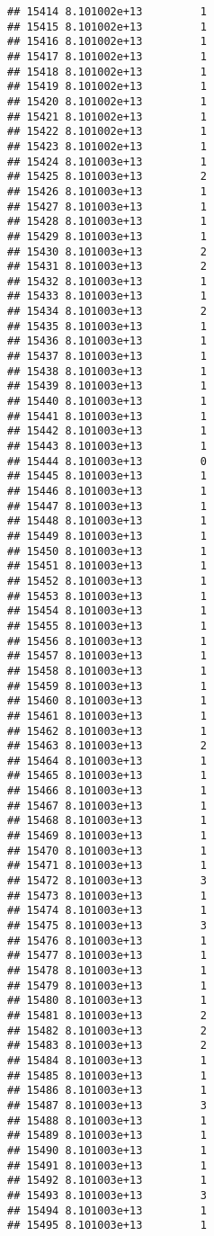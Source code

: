 \documentclass[
]{article}
\begin{document}
\begin{verbatim}
## 15414 8.101002e+13         1
## 15415 8.101002e+13         1
## 15416 8.101002e+13         1
## 15417 8.101002e+13         1
## 15418 8.101002e+13         1
## 15419 8.101002e+13         1
## 15420 8.101002e+13         1
## 15421 8.101002e+13         1
## 15422 8.101002e+13         1
## 15423 8.101002e+13         1
## 15424 8.101003e+13         1
## 15425 8.101003e+13         2
## 15426 8.101003e+13         1
## 15427 8.101003e+13         1
## 15428 8.101003e+13         1
## 15429 8.101003e+13         1
## 15430 8.101003e+13         2
## 15431 8.101003e+13         2
## 15432 8.101003e+13         1
## 15433 8.101003e+13         1
## 15434 8.101003e+13         2
## 15435 8.101003e+13         1
## 15436 8.101003e+13         1
## 15437 8.101003e+13         1
## 15438 8.101003e+13         1
## 15439 8.101003e+13         1
## 15440 8.101003e+13         1
## 15441 8.101003e+13         1
## 15442 8.101003e+13         1
## 15443 8.101003e+13         1
## 15444 8.101003e+13         0
## 15445 8.101003e+13         1
## 15446 8.101003e+13         1
## 15447 8.101003e+13         1
## 15448 8.101003e+13         1
## 15449 8.101003e+13         1
## 15450 8.101003e+13         1
## 15451 8.101003e+13         1
## 15452 8.101003e+13         1
## 15453 8.101003e+13         1
## 15454 8.101003e+13         1
## 15455 8.101003e+13         1
## 15456 8.101003e+13         1
## 15457 8.101003e+13         1
## 15458 8.101003e+13         1
## 15459 8.101003e+13         1
## 15460 8.101003e+13         1
## 15461 8.101003e+13         1
## 15462 8.101003e+13         1
## 15463 8.101003e+13         2
## 15464 8.101003e+13         1
## 15465 8.101003e+13         1
## 15466 8.101003e+13         1
## 15467 8.101003e+13         1
## 15468 8.101003e+13         1
## 15469 8.101003e+13         1
## 15470 8.101003e+13         1
## 15471 8.101003e+13         1
## 15472 8.101003e+13         3
## 15473 8.101003e+13         1
## 15474 8.101003e+13         1
## 15475 8.101003e+13         3
## 15476 8.101003e+13         1
## 15477 8.101003e+13         1
## 15478 8.101003e+13         1
## 15479 8.101003e+13         1
## 15480 8.101003e+13         1
## 15481 8.101003e+13         2
## 15482 8.101003e+13         2
## 15483 8.101003e+13         2
## 15484 8.101003e+13         1
## 15485 8.101003e+13         1
## 15486 8.101003e+13         1
## 15487 8.101003e+13         3
## 15488 8.101003e+13         1
## 15489 8.101003e+13         1
## 15490 8.101003e+13         1
## 15491 8.101003e+13         1
## 15492 8.101003e+13         1
## 15493 8.101003e+13         3
## 15494 8.101003e+13         1
## 15495 8.101003e+13         1

\end{verbatim}
\end{document}
